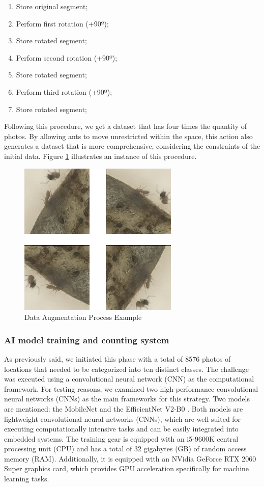 \begin{enumerate}
    \item Store original segment;
    \item Perform first rotation (+90º);
    \item Store rotated segment;
    \item Perform second rotation (+90º);
    \item Store rotated segment;
    \item Perform third rotation (+90º);
    \item Store rotated segment;
\end{enumerate}

Following this procedure, we get a dataset that has four times the quantity of photos. By allowing ants to move unrestricted within the space, this action also generates a dataset that is more comprehensive, considering the constraints of the initial data. Figure \ref{fig:data-aug} illustrates an instance of this procedure.

\begin{figure}
    \centering
    \includegraphics[width = .45\linewidth]{Figures/data_aug.png}
    \caption{Data Augmentation Process Example}
    \label{fig:data-aug}
\end{figure}

\subsubsection{AI model training and counting system}

As previously said, we initiated this phase with a total of 8576 photos of locations that needed to be categorized into ten distinct classes. The challenge was executed using a convolutional neural network (CNN) as the computational framework. For testing reasons, we examined two high-performance convolutional neural networks (CNNs) as the main frameworks for this strategy. Two models are mentioned: the MobileNet \cite{howard2017mobilenets} and the EfficientNet V2-B0 \cite{tan2021efficientnetv2}. Both models are lightweight convolutional neural networks (CNNs), which are well-suited for executing computationally intensive tasks and can be easily integrated into embedded systems. The training gear is equipped with an i5-9600K central processing unit (CPU) and has a total of 32 gigabytes (GB) of random access memory (RAM). Additionally, it is equipped with an NVidia GeForce RTX 2060 Super graphics card, which provides GPU acceleration specifically for machine learning tasks.

